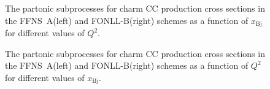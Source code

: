 \documentclass[pdftex,twocolumn,epjc3]{svjour3}          %
\newcommand{\xbj}{\ensuremath{x_{\text{Bj}}}\xspace}
\newcommand{\fonll} {{FONLL-B}\xspace}
\newcommand{\ffns} {{FFNS~A}\xspace}
\begin{document}
\begin{figure}
    \centering
    \caption{The partonic subprocesses for charm CC production cross sections in the \ffns (left) and \fonll (right) schemes as a function of \xbj for different values of $Q^2$.}
    \label{fig:partonic-x}
\end{figure}

\begin{figure}
    \centering
    \caption{The partonic subprocesses for charm CC production cross sections in the \ffns (left) and \fonll (right) schemes as a function of $Q^2$ for different values of \xbj.}
    \label{fig:partonic-q2}
\end{figure}
\end{document}
